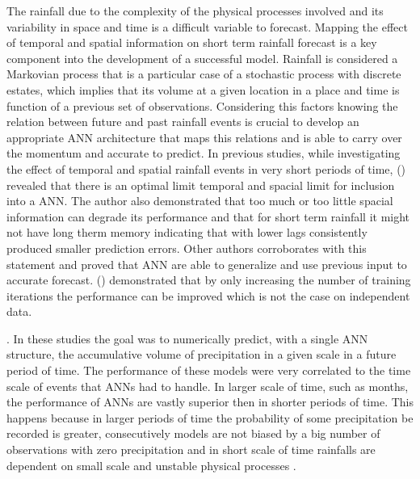 The rainfall due to the complexity of the physical processes involved and its variability in space and time is a difficult variable to forecast. Mapping the effect of temporal and spatial information on short term rainfall forecast is a key component into the development of a successful model. Rainfall is considered a Markovian process \cite{luk2000study} that  is a particular case of a stochastic process with discrete estates, which implies that its volume at a given location in a place and time is function of a previous set of observations. Considering this factors knowing the relation between future and past rainfall events is crucial to develop an appropriate ANN architecture that maps this relations and is able to carry over the momentum and accurate to predict. In previous studies, while investigating the effect of temporal and spatial rainfall events in very short periods of time, \citeauthor{luk2000study} (\citeyear{luk2000study}) revealed that there is an optimal limit temporal and spacial limit for inclusion into a ANN. The author also demonstrated that too much or too little spacial information can degrade its performance and that for short term rainfall it might not have long therm memory indicating that with lower lags consistently produced smaller prediction errors. Other authors corroborates with this statement and proved that ANN are able to generalize and use previous input to accurate forecast. \citeauthor{french1992rainfall} (\citeyear{french1992rainfall}) demonstrated that by only increasing the number of training iterations the performance can be improved which is not the case on independent data.



\cite{kumarasiri2006rainfall, nasseri2008optimized, ramirez2006linear, luk2000study, french1992rainfall, toth2000comparison, partal2015daily}. In these studies the goal was to numerically predict, with a single ANN structure, the accumulative volume of precipitation in a given scale in a future period of time. The performance of these models were very correlated to the time scale of events that ANNs had to handle. In larger scale of time, such as months, the performance of ANNs are vastly superior then in shorter periods of time. This happens because in larger periods of time the probability of some precipitation be recorded is greater, consecutively models are not biased by a big number of observations with zero precipitation \cite{schoof2001downscaling} and in short scale of time rainfalls are dependent on small scale and unstable physical processes \cite{kuligowski1998localized}.

